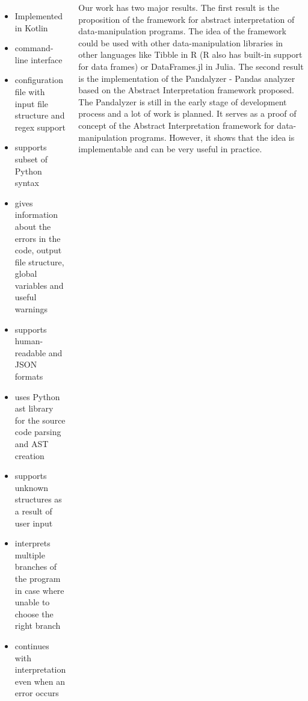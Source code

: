 \documentclass{tikzposter}
\begin{document}
\begin{columns}
        {
            \Large
            \begin{itemize}
                \item Implemented in Kotlin
                \item command-line interface
                \item configuration file with input file structure and regex support
                \item supports subset of Python syntax
                \item gives information about the errors in the code, output file structure, global variables and useful warnings
                \item supports human-readable and JSON formats
                \item uses Python ast library for the source code parsing and AST creation
                \item supports unknown structures as a result of user input
                \item interprets multiple branches of the program in case where unable to choose the right branch
                \item continues with interpretation even when an error occurs
            \end{itemize} %
        }



        {
            \Large
            Our work has two major results.
            The first result is the proposition of the framework for abstract interpretation of data-manipulation programs.
            The idea of the framework could be used with other data-manipulation libraries in other languages like
            Tibble in R (R also has built-in support for data frames) or DataFrames.jl in Julia.
            The second result is the implementation of the Pandalyzer - Pandas analyzer based
            on the Abstract Interpretation framework proposed.
            The Pandalyzer is still in the early stage of development process and a lot of work is planned.
            It serves as a proof of concept of the Abstract Interpretation framework for data-manipulation programs.
            However, it shows that the idea is implementable and can be very useful in practice.
        }

    \end{columns}
\end{document}
